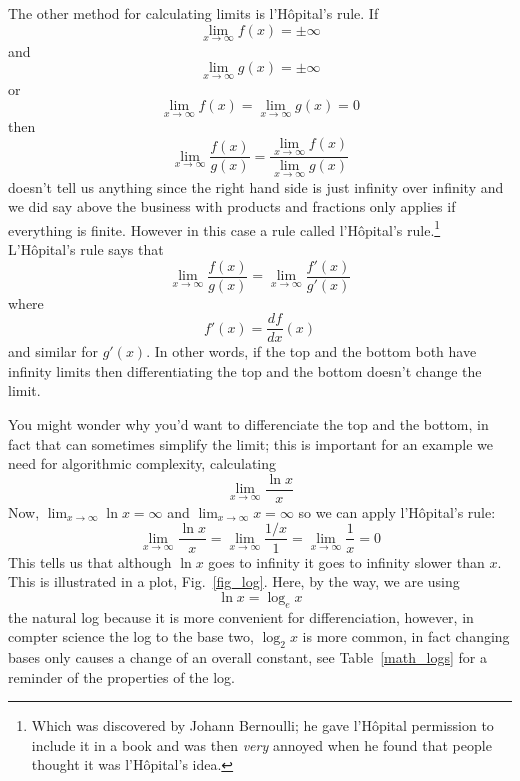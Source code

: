 \documentclass[11pt,a4paper]{scrartcl}
\begin{document}
The other method for calculating limits is l'H\^{o}pital's rule. If 
\begin{equation}
\lim_{x\rightarrow \infty}f(x)=\pm\infty
\end{equation}
and
\begin{equation}
\lim_{x\rightarrow \infty}g(x)=\pm\infty
\end{equation}
or
\begin{equation}
\lim_{x\rightarrow \infty}f(x)=\lim_{x\rightarrow \infty}g(x)=0
\end{equation}
then
\begin{equation}
\lim_{x\rightarrow \infty}\frac{f(x)}{g(x)}=\frac{\lim_{x\rightarrow \infty} f(x)}{\lim_{x\rightarrow \infty} g(x)}
\end{equation}
doesn't tell us anything since the right hand side is just infinity
over infinity and we did say above the business with products and
fractions only applies if everything is finite. However in this case a
rule called l'H\^{o}pital's rule.\footnote{Which was discovered by
  Johann Bernoulli; he gave l'H\^{o}pital permission to include it in
  a book and was then \textsl{very} annoyed when he found that people
  thought it was l'H\^{o}pital's idea.} L'H\^{o}pital's rule says that
\begin{equation}
\lim_{x\rightarrow \infty}\frac{f(x)}{g(x)}=\lim_{x\rightarrow \infty}\frac{f'(x)}{g'(x)}
\end{equation}
where 
\begin{equation}
f'(x)=\frac{df}{dx}(x)
\end{equation}
and similar for $g'(x)$. In other words, if the top and the bottom
both have infinity limits then differentiating the top and the bottom
doesn't change the limit. 

You might wonder why you'd want to differenciate the top and the
bottom, in fact that can sometimes simplify the limit; this is
important for an example we need for algorithmic complexity, calculating
\begin{equation}
\lim_{x\rightarrow \infty}\frac{\ln{x}}{x}
\end{equation}
Now, $\lim_{x\rightarrow\infty}\ln{x}=\infty$ and $\lim_{x\rightarrow \infty}x=\infty$ so we can apply l'H\^{o}pital's rule:
\begin{equation}
\lim_{x\rightarrow \infty}\frac{\ln{x}}{x}=\lim_{x\rightarrow \infty}\frac{1/x}{1}=\lim_{x\rightarrow \infty}\frac{1}{x}=0
\end{equation}
This tells us that although $\ln{x}$ goes to infinity it goes to
infinity slower than $x$.  This is illustrated in a plot,
Fig.~\ref{fig_log}. Here, by the way, we are using
\begin{equation}
\ln{x}=\log_e{x}
\end{equation}
the natural log because it is more convenient for differenciation,
however, in compter science the log to the base two, $\log_2{x}$ is
more common, in fact changing bases only causes a change of an overall
constant, see Table~\ref{math_logs} for a reminder of the properties
of the log.
\end{document}
